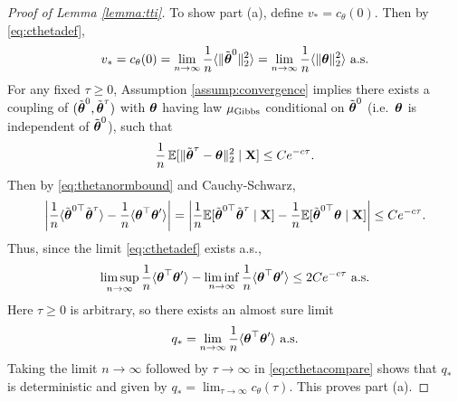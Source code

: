 \begin{proof}[Proof of Lemma \ref{lemma:tti}]
To show part (a), define $v_*=c_\theta(0)$.
Then by \eqref{eq:cthetadef},
\[v_*=c_\theta(0)=\lim_{n \to \infty}
\frac{1}{n} \langle \|\tilde {\boldsymbol{\theta}}^0\|_2^2 \rangle
=\lim_{n \to \infty} \frac{1}{n} \langle \|\boldsymbol{\theta}\|_2^2 \rangle \text{ a.s.}\]
For any fixed $\tau \geq 0$, Assumption \ref{assump:convergence} implies
there exists a coupling of
$(\tilde{\boldsymbol{\theta}}^0,\tilde {\boldsymbol{\theta}}^\tau)$ with $\boldsymbol{\theta}$ having law
$\mu_{\mathrm{Gibbs}}$ conditional on $\tilde {\boldsymbol{\theta}}^0$ (i.e.\ $\boldsymbol{\theta}$ is independent
of $\tilde {\boldsymbol{\theta}}^0$), such that
\begin{equation}\label{eq:thetaequilibriumcoupling}
\frac{1}{n}\,\mathbb{E}[\|\tilde {\boldsymbol{\theta}}^\tau-\boldsymbol{\theta}\|_2^2 \mid \mathbf{X}]
\leq Ce^{-c\tau}.
\end{equation}
Then by \eqref{eq:thetanormbound} and Cauchy-Schwarz,
\begin{equation}\label{eq:cthetacompare}
\left|\frac{1}{n}\langle \tilde {\boldsymbol{\theta}}^{0\top}\tilde {\boldsymbol{\theta}}^\tau
\rangle-\frac{1}{n} \langle \boldsymbol{\theta}^\top \boldsymbol{\theta}' \rangle\right|
=\left|\frac{1}{n}\mathbb{E}[\tilde {\boldsymbol{\theta}}^{0\top}\tilde {\boldsymbol{\theta}}^\tau\mid \mathbf{X}]
-\frac{1}{n}\mathbb{E}[\tilde {\boldsymbol{\theta}}^{0\top}\boldsymbol{\theta} \mid \mathbf{X}]\right|
\leq Ce^{-c\tau}.
\end{equation}
Thus, since the limit \eqref{eq:cthetadef} exists a.s.,
\[\limsup_{n \to \infty} \frac{1}{n} \langle \boldsymbol{\theta}^\top \boldsymbol{\theta}' \rangle
-\liminf_{n \to \infty} \frac{1}{n} \langle \boldsymbol{\theta}^\top \boldsymbol{\theta}' \rangle
\leq 2Ce^{-c\tau} \text{ a.s.}\]
Here $\tau \geq 0$ is arbitrary, so there exists an almost sure limit
\[q_*=\lim_{n \to \infty} \frac{1}{n} \langle \boldsymbol{\theta}^\top \boldsymbol{\theta}' \rangle
\text{ a.s.}\]
Taking the limit $n \to \infty$ followed by $\tau \to \infty$
in \eqref{eq:cthetacompare} shows that
$q_*$ is deterministic and given by $q_*=\lim_{\tau \to \infty} c_\theta(\tau)$.
This proves part (a).


\end{proof}

